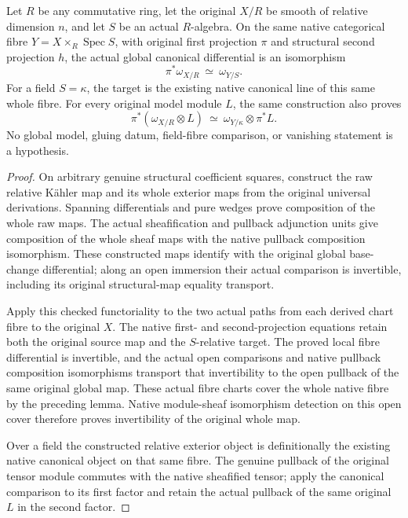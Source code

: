 \begin{theorem}
\label{thm:kn-arithmetic-global-canonical-fibre}
\leanok
{}
Let $R$ be any commutative ring, let the original $X/R$ be smooth of relative
dimension $n$, and let $S$ be an actual $R$-algebra.  On the same native
categorical fibre $Y=X\times_R\operatorname{Spec}S$, with original first
projection $\pi$ and structural second projection $h$, the actual global
canonical differential is an isomorphism
\[
  \pi^*\omega_{X/R}\ \simeq\ \omega_{Y/S}.
\]
For a field $S=\kappa$, the target is the existing native canonical line of
this same whole fibre.  For every original model module $L$, the same
construction also proves
\[
  \pi^*(\omega_{X/R}\otimes L)
    \ \simeq\ \omega_{Y/\kappa}\otimes\pi^*L.
\]
No global model, gluing datum, field-fibre comparison, or vanishing statement
is a hypothesis.
\end{theorem}
\begin{proof}
On arbitrary genuine structural coefficient squares, construct the raw
relative K\"ahler map and its whole exterior maps from the original universal
derivations.  Spanning differentials and pure wedges prove composition of
the whole raw maps.  The actual sheafification and pullback adjunction units
give composition of the whole sheaf maps with the native pullback composition
isomorphism.  These constructed maps identify with the original global
base-change differential; along an open immersion their actual comparison is
invertible, including its original structural-map equality transport.

Apply this checked functoriality to the two actual paths from each derived
chart fibre to the original $X$.  The native first- and second-projection
equations retain both the original source map and the $S$-relative target.
The proved local fibre differential is invertible, and the actual open
comparisons and native pullback composition isomorphisms transport that
invertibility to the open pullback of the same original global map.
These actual fibre charts cover the whole native fibre by the preceding
lemma.  Native module-sheaf isomorphism detection on this open cover therefore
proves invertibility of the original whole map.

Over a field the constructed relative exterior object is definitionally the
existing native canonical object on that same fibre.  The genuine pullback
of the original tensor module commutes with the native sheafified tensor;
apply the canonical comparison to its first factor and retain the actual
pullback of the same original $L$ in the second factor.
\end{proof}
